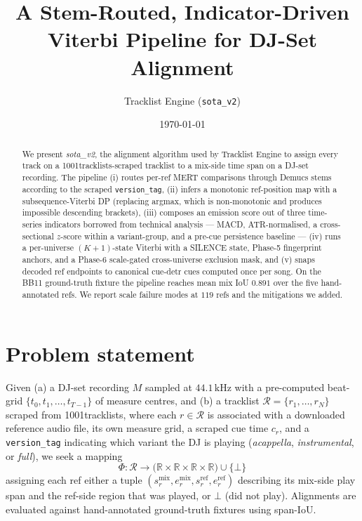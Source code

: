 \documentclass[11pt,a4paper]{article}
\title{A Stem-Routed, Indicator-Driven Viterbi Pipeline for DJ-Set Alignment}
\author{Tracklist Engine (\texttt{sota\_v2})}
\date{\today}
\begin{document}
\maketitle

\begin{abstract}
We present \emph{sota\_v2}, the alignment algorithm used by Tracklist Engine to assign every track on a 1001tracklists-scraped tracklist to a mix-side time span on a DJ-set recording. The pipeline (i) routes per-ref MERT comparisons through Demucs stems according to the scraped \texttt{version\_tag}, (ii) infers a monotonic ref-position map with a subsequence-Viterbi DP (replacing argmax, which is non-monotonic and produces impossible descending brackets), (iii) composes an emission score out of three time-series indicators borrowed from technical analysis --- MACD, ATR-normalised, a cross-sectional $z$-score within a variant-group, and a pre-cue persistence baseline --- (iv) runs a per-universe $(K{+}1)$-state Viterbi with a SILENCE state, Phase-5 fingerprint anchors, and a Phase-6 scale-gated cross-universe exclusion mask, and (v) snaps decoded ref endpoints to canonical cue-detr cues computed once per song. On the BB11 ground-truth fixture the pipeline reaches mean mix IoU $0.891$ over the five hand-annotated refs. We report scale failure modes at $119$ refs and the mitigations we added.
\end{abstract}

\section{Problem statement}

Given (a) a DJ-set recording $M$ sampled at $44.1\,\text{kHz}$ with a pre-computed beat-grid $\{t_0, t_1, \dots, t_{T-1}\}$ of measure centres, and (b) a tracklist $\mathcal{R} = \{r_1, \dots, r_N\}$ scraped from 1001tracklists, where each $r \in \mathcal{R}$ is associated with a downloaded reference audio file, its own measure grid, a scraped cue time $c_r$, and a \texttt{version\_tag} indicating which variant the DJ is playing (\emph{acappella}, \emph{instrumental}, or \emph{full}), we seek a mapping
\[
\Phi : \mathcal{R} \to \big(\mathbb{R} \times \mathbb{R} \times \mathbb{R} \times \mathbb{R}\big) \cup \{\bot\}
\]
assigning each ref either a tuple $(s^{\text{mix}}_r, e^{\text{mix}}_r, s^{\text{ref}}_r, e^{\text{ref}}_r)$ describing its mix-side play span and the ref-side region that was played, or $\bot$ (did not play). Alignments are evaluated against hand-annotated ground-truth fixtures using span-IoU.
\end{document}

